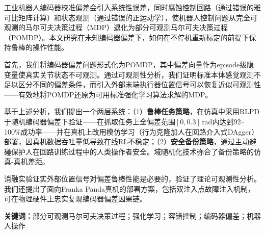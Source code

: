 
工业机器人编码器校准偏差会引入系统性误差，同时腐蚀控制回路（通过错误的雅可比矩阵计算）和状态观测（通过错误的正运动学），使机器人控制问题从完全可观测的马尔可夫决策过程（MDP）退化为部分可观测马尔可夫决策过程（POMDP）。本文研究在未知编码器偏差下，如何在不停机重新标定的前提下保持鲁棒的操作性能。

首先，我们将编码器偏差问题形式化为POMDP，其中偏差向量作为episode级隐变量使真实关节状态不可观测。通过可观测性分析，我们证明标准本体感觉观测不足以区分不同的偏差条件，而引入外部末端执行器位置信号可以恢复近似可观测性——有效地将POMDP还原为可用标准强化学习算法求解的MDP。

基于上述分析，我们提出一个两层系统：（1）\textbf{鲁棒任务策略}，在仿真中采用RLPD于随机编码器偏差下验证——在抓取任务上全偏差范围$[0, 0.3]$\,rad内达到92--100\%成功率——并在真机上改用模仿学习（行为克隆加人在回路介入式DAgger）部署，因真机数据吞吐量低导致在线RL不稳定；（2）\textbf{安全备份策略}，通过主动避碰保护人在回路训练过程中的人类操作者安全。域随机化技术弥合了备份策略的仿真-真机差距。

消融实验证实外部位置信号对偏差鲁棒性能是必要的，验证了理论可观测性分析。我们还提出了面向Franka Panda真机的部署方案，包括双注入点故障注入机制，可在物理硬件上忠实复现编码器偏差因果链。

\vspace{1em}
\noindent\textbf{关键词：}部分可观测马尔可夫决策过程；强化学习；容错控制；编码器偏差；机器人操作
